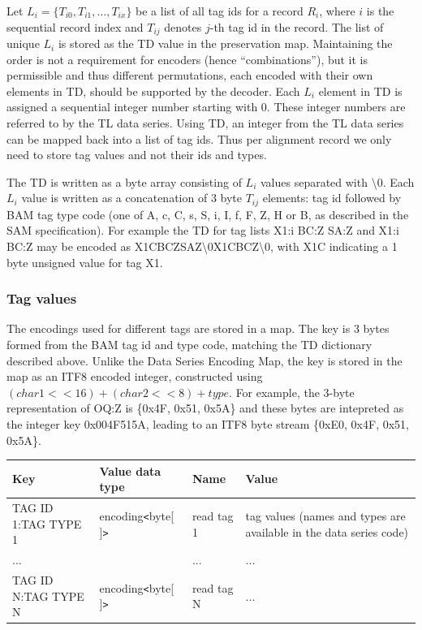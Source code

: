 \documentclass[a4paper]{article}
\begin{document}
Let $L_{i}=\{T_{i0}, T_{i1}, \ldots, T_{ix}\}$ be a list of all tag ids for a record $R_{i}$, where $i$ is the sequential record index and $T_{ij}$ denotes $j$-th tag id in the record.
The list of unique $L_{i}$ is stored as the TD value in the preservation map.
Maintaining the order is not a requirement for encoders (hence ``combinations''), but it is permissible and thus different permutations, each encoded with their own elements in TD, should be supported by the decoder.
Each $L_{i}$ element in TD is assigned a sequential integer number starting with 0.
These integer numbers are referred to by the TL data series.
Using TD, an integer from the TL data series can be mapped back into a list of tag ids.
Thus per alignment record we only need to store tag values and not their ids and types.

The TD is written as a byte array consisting of $L_{i}$ values separated with \textbackslash{}0.
Each $L_{i}$ value is written as a concatenation of 3 byte $T_{ij}$ elements: tag id followed by BAM tag type code (one of A, c, C, s, S, i, I, f, F, Z, H or B, as described in the SAM specification).
For example the TD for tag lists X1:i BC:Z SA:Z and X1:i BC:Z may be encoded as X1CBCZSAZ\textbackslash{}0X1CBCZ\textbackslash{}0, with X1C indicating a 1 byte unsigned value for tag X1.

\subsubsection*{Tag values}

The encodings used for different tags are stored in a map.
The key is 3 bytes formed from the BAM tag id and type code, matching the TD dictionary described above.
Unlike the Data Series Encoding Map, the key is stored in the map as an ITF8 encoded integer, constructed using $(char1<<16) + (char2<<8) + type$.
For example, the 3-byte representation of OQ:Z is \{0x4F, 0x51, 0x5A\} and these bytes are intepreted as the integer key 0x004F515A, leading to an ITF8 byte stream \{0xE0, 0x4F, 0x51, 0x5A\}.

\begin{tabular}{|l|l|l|>{\raggedright}p{160pt}|}
\hline
\textbf{Key} & \textbf{Value data type} & \textbf{Name} & \textbf{Value}
\tabularnewline
\hline
TAG ID 1:TAG TYPE 1 & encoding\texttt{<}byte[ ]\texttt{>} & read tag 1 & tag values
(names and types are available in the data series code)\tabularnewline
\hline
... &  & ... & ...\tabularnewline
\hline
TAG ID N:TAG TYPE N & encoding\texttt{<}byte[ ]\texttt{>} & read tag N & ...\tabularnewline
\hline
\end{tabular}
\end{document}
